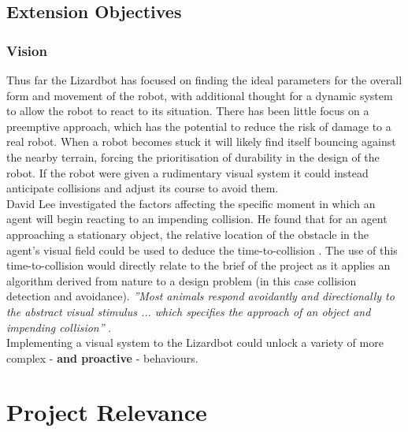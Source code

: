 \documentclass{article}
\begin{document}
\subsection{Extension Objectives}
\label{sec:Extension Objectives}
\subsubsection{Vision}
\label{sec:Vision}
Thus far the Lizardbot has focused on finding the ideal parameters for the overall form and movement of the robot, with additional thought for a dynamic system to allow the robot to react to its situation. There has been little focus on a preemptive approach, which has the potential to reduce the risk of damage to a real robot. When a robot becomes stuck it will likely find itself bouncing against the nearby terrain, forcing the prioritisation of durability in the design of the robot. If the robot were given a rudimentary visual system it could instead anticipate collisions and adjust its course to avoid them.\\ David Lee investigated the factors affecting the specific moment in which an agent will begin reacting to an impending collision. He found that for an agent approaching a stationary object, the relative location of the obstacle in the agent’s visual field could be used to deduce the time-to-collision . The use of this time-to-collision would directly relate to the brief of the project as it applies an algorithm derived from nature to a design problem (in this case collision detection and avoidance). \textit{”Most animals respond avoidantly and directionally to the abstract visual stimulus ... which specifies the approach of an object and impending collision”} .\\
Implementing a visual system to the Lizardbot could unlock a variety of more complex - \textbf{and proactive} - behaviours.

\newpage
\section{Project Relevance}
\label{sec:Project Relevance}
\end{document}
